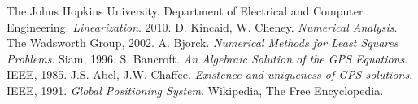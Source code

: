 \documentclass{article}
\begin{document}
\begin{thebibliography}{100}
 The Johns Hopkins University. Department of Electrical and Computer Engineering. \emph{Linearization}. 2010.
 D. Kincaid, W. Cheney. \emph{Numerical Analysis}. The Wadsworth Group, 2002.
 A. Bjorck. \emph{Numerical Methods for Least Squares Problems}. Siam, 1996.
 S. Bancroft. \emph{An Algebraic Solution of the GPS Equations}. IEEE, 1985.
 J.S. Abel, J.W. Chaffee. \emph{Existence and uniqueness of GPS solutions}. IEEE, 1991.
 \emph{Global Positioning System}. Wikipedia, The Free Encyclopedia.
\end{thebibliography}
\end{document}
